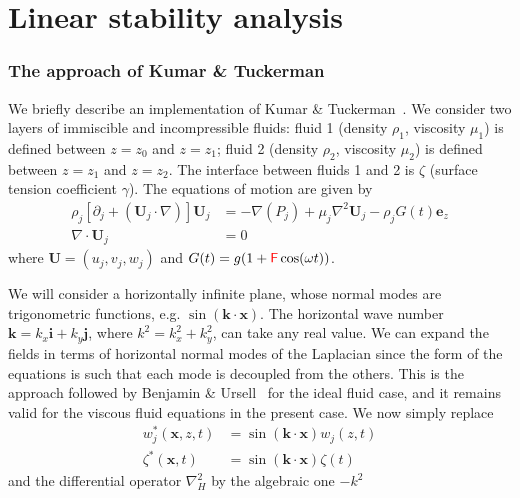 \documentclass[prfluids]{revtex4-2}
\renewcommand*{\vec}[1]{\boldsymbol{#1}}
\newcommand{\paramF  }{\mathsf{\color{red}F}}
\begin{document}
\doublespacing

\section*{Linear stability analysis}

\subsubsection*{The approach of Kumar \& Tuckerman~\cite{Kumar_1994}}

We briefly describe an implementation of Kumar \& Tuckerman~\cite{Kumar_1994}.
We consider two layers of immiscible and incompressible fluids: fluid 1 (density
$\rho_1$, viscosity $\mu_1$) is defined between $z=z_0$ and $z=z_1$; fluid 2
(density $\rho_2$, viscosity $\mu_2$) is defined between $z=z_1$ and $z=z_2$.
The interface between fluids 1 and 2 is $\zeta$ (surface tension coefficient
$\gamma$). The equations of motion are given by
\begin{subequations}
  \begin{align}
    \label{eq1a}
    \rho_j \left[
      \partial_j + (\vec{U}_j\cdot\nabla) \right]\vec{U}_j &=
    -\nabla(P_j) + \mu_j\nabla^2\vec{U}_j
    - \rho_j G(t) \vec{e}_z
    \\
    \label{eq1b}
    \nabla\cdot\vec{U}_j &= 0
  \end{align}
\end{subequations}
where $\vec{U}=(u_j,v_j,w_j)$ and $G(t)=g (1 + \paramF\cos(\omega t))$.

We will consider a horizontally infinite plane, whose normal modes are
trigonometric functions, e.g. $\sin (\vec{k}\cdot\vec{x} )$. The horizontal wave
number $\vec{k}=k_x\vec{i} + k_y\vec{j}$, where $k^2 = k_x^2 + k_y^2$, can take
any real value. We can expand the fields in terms of horizontal normal modes of
the Laplacian since the form of the equations is such that each mode is
decoupled from the others. This is the approach followed by Benjamin \&
Ursell~\cite{Benjamin1954} for the ideal fluid case, and it remains valid for
the viscous fluid equations in the present case. We now simply replace 
\begin{subequations}
  \begin{align}
    \label{eq2a}
    w_j^*(\vec{x},z,t) &= \sin(\vec{k}\cdot\vec{x}) w_j (z,t) 
    \\
    \label{eq2b}
    \zeta^*(\vec{x},t) &= \sin(\vec{k}\cdot\vec{x}) \zeta (t) 
  \end{align}
\end{subequations}
and the differential operator $\nabla^2_H$ by the algebraic one $-k^2$
\end{document}
